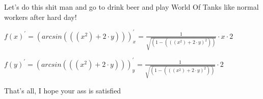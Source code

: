 \documentclass{article}
\begin{document}
Let's do this shit man and go to drink beer and play World Of Tanks like normal workers after hard day!


$f(x)^\prime = ( arcsin( ((x ^{ 2}) + 2 \cdot y)))_{x}^\prime =  \frac{ 1}{\sqrt{(1 - (((x ^{ 2}) + 2 \cdot y) ^{ 2}))}} \cdot x \cdot 2$


$f(y)^\prime = ( arcsin( ((x ^{ 2}) + 2 \cdot y)))_{y}^\prime =  \frac{ 1}{\sqrt{(1 - (((x ^{ 2}) + 2 \cdot y) ^{ 2}))}} \cdot 2$


	That's all, I hope your ass is satisfied
\end{document}
